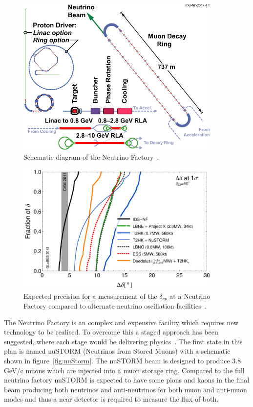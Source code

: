 \begin{figure}[h!]
\centering
\includegraphics[width=0.9\textwidth]{figures/131112-IDS-NF.pdf}
\caption{Schematic diagram of the Neutrino Factory~\cite{Fix7}.}
\label{fig:nuFact}
\end{figure}

\begin{figure}[h!]
\centering
\includegraphics[width=0.9\textwidth]{figures/rdr-cp-precision-comparison-131216.pdf}
\caption{Expected precision for a measurement of the $\delta_{cp}$ at a Neutrino Factory compared to alternate neutrino oscillation facilities~\cite{Fix7}.}
\label{fig:nuFactExp}
\end{figure}

The Neutrino Factory is an complex and expensive facility which requires new technology to be realised. To overcome this a staged approach has been suggested, where each stage would be delivering physics~\cite{Fix7}. The first state in this plan is named nuSTORM (Neutrinos from Stored Muons) with a schematic shown in figure~\ref{fig:nuStorm}. The nuSTORM beam is designed to produce 3.8 GeV/c muons which are injected into a muon storage ring. Compared to the full neutrino factory nuSTORM is expected to have some pions and kaons in the final beam producing both neutrinos and anti-neutrinos for both muon and anti-muon modes and thus a near detector is required to measure the flux of both. 

